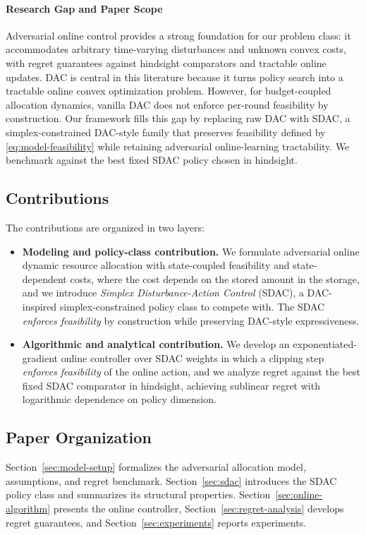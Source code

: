 \documentclass[11pt]{article}
\begin{document}
\paragraph{Research Gap and Paper Scope} Adversarial online control provides a strong foundation for our problem class: it accommodates arbitrary time-varying disturbances and unknown convex costs, with regret guarantees against hindsight comparators and tractable online updates. DAC is central in this literature because it turns policy search into a tractable online convex optimization problem. However, for budget-coupled allocation dynamics, vanilla DAC does not enforce per-round feasibility by construction. Our framework fills this gap by replacing raw DAC with SDAC, a simplex-constrained DAC-style family that preserves feasibility defined by \eqref{eq:model-feasibility} while retaining adversarial online-learning tractability. We benchmark against the best fixed SDAC policy chosen in hindsight.




\subsection{Contributions}
The contributions are organized in two layers:
\begin{itemize}
    \item \textbf{Modeling and policy-class contribution.} We formulate adversarial online dynamic resource allocation with state-coupled feasibility and state-dependent costs, where the cost depends on the stored amount in the storage, and we introduce \emph{Simplex Disturbance-Action Control} (SDAC), a DAC-inspired simplex-constrained policy class to compete with. The SDAC \emph{enforces feasibility} by construction while preserving DAC-style expressiveness.
    \item \textbf{Algorithmic and analytical contribution.} We develop an exponentiated-gradient online controller over SDAC weights in which a clipping step \emph{enforces feasibility} of the online action, and we analyze regret against the best fixed SDAC comparator in hindsight, achieving sublinear regret with logarithmic dependence on policy dimension.
\end{itemize}

\subsection{Paper Organization}
Section~\ref{sec:model-setup} formalizes the adversarial allocation model, assumptions, and regret benchmark. Section~\ref{sec:sdac} introduces the SDAC policy class and summarizes its structural properties. Section~\ref{sec:online-algorithm} presents the online controller, Section~\ref{sec:regret-analysis} develops regret guarantees, and Section~\ref{sec:experiments} reports experiments.
\end{document}
